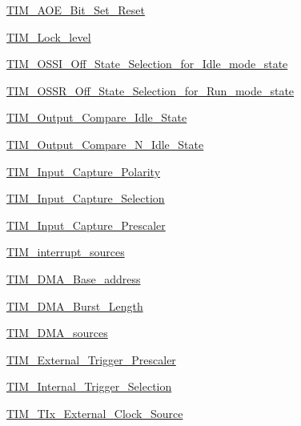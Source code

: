 \begin{DoxyCompactItemize}
\item 
\hyperlink{group___t_i_m___a_o_e___bit___set___reset}{T\-I\-M\-\_\-\-A\-O\-E\-\_\-\-Bit\-\_\-\-Set\-\_\-\-Reset}
\item 
\hyperlink{group___t_i_m___lock__level}{T\-I\-M\-\_\-\-Lock\-\_\-level}
\item 
\hyperlink{group___t_i_m___o_s_s_i___off___state___selection__for___idle__mode__state}{T\-I\-M\-\_\-\-O\-S\-S\-I\-\_\-\-Off\-\_\-\-State\-\_\-\-Selection\-\_\-for\-\_\-\-Idle\-\_\-mode\-\_\-state}
\item 
\hyperlink{group___t_i_m___o_s_s_r___off___state___selection__for___run__mode__state}{T\-I\-M\-\_\-\-O\-S\-S\-R\-\_\-\-Off\-\_\-\-State\-\_\-\-Selection\-\_\-for\-\_\-\-Run\-\_\-mode\-\_\-state}
\item 
\hyperlink{group___t_i_m___output___compare___idle___state}{T\-I\-M\-\_\-\-Output\-\_\-\-Compare\-\_\-\-Idle\-\_\-\-State}
\item 
\hyperlink{group___t_i_m___output___compare___n___idle___state}{T\-I\-M\-\_\-\-Output\-\_\-\-Compare\-\_\-\-N\-\_\-\-Idle\-\_\-\-State}
\item 
\hyperlink{group___t_i_m___input___capture___polarity}{T\-I\-M\-\_\-\-Input\-\_\-\-Capture\-\_\-\-Polarity}
\item 
\hyperlink{group___t_i_m___input___capture___selection}{T\-I\-M\-\_\-\-Input\-\_\-\-Capture\-\_\-\-Selection}
\item 
\hyperlink{group___t_i_m___input___capture___prescaler}{T\-I\-M\-\_\-\-Input\-\_\-\-Capture\-\_\-\-Prescaler}
\item 
\hyperlink{group___t_i_m__interrupt__sources}{T\-I\-M\-\_\-interrupt\-\_\-sources}
\item 
\hyperlink{group___t_i_m___d_m_a___base__address}{T\-I\-M\-\_\-\-D\-M\-A\-\_\-\-Base\-\_\-address}
\item 
\hyperlink{group___t_i_m___d_m_a___burst___length}{T\-I\-M\-\_\-\-D\-M\-A\-\_\-\-Burst\-\_\-\-Length}
\item 
\hyperlink{group___t_i_m___d_m_a__sources}{T\-I\-M\-\_\-\-D\-M\-A\-\_\-sources}
\item 
\hyperlink{group___t_i_m___external___trigger___prescaler}{T\-I\-M\-\_\-\-External\-\_\-\-Trigger\-\_\-\-Prescaler}
\item 
\hyperlink{group___t_i_m___internal___trigger___selection}{T\-I\-M\-\_\-\-Internal\-\_\-\-Trigger\-\_\-\-Selection}
\item 
\hyperlink{group___t_i_m___t_ix___external___clock___source}{T\-I\-M\-\_\-\-T\-Ix\-\_\-\-External\-\_\-\-Clock\-\_\-\-Source}

\end{DoxyCompactItemize}
